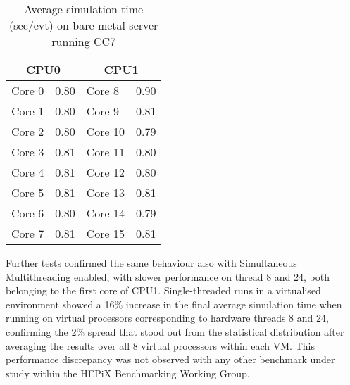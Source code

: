 \documentclass[a4paper]{jpconf}
\begin{document}

\begin{wraptable}{l}{0.35\linewidth}
    \vspace{-3mm}
    \caption{Average simulation time \newline (sec/evt) on bare-metal server \newline 
             running CC7}
    \label{table:simulation-time-cores}
    \begin{tabular}{ |l |  l  || l | l|}
        \hline
        \multicolumn{2}{|c||}{CPU0} & \multicolumn{2}{|c|}{CPU1} \\
        \hline
         Core 0  & 0.80 & Core 8  & 0.90\\
        \hline
         Core 1  & 0.80 & Core 9  & 0.81\\
        \hline
         Core 2  & 0.80 & Core 10  & 0.79\\
        \hline
         Core 3  & 0.81 & Core 11  & 0.80\\
        \hline
         Core 4  & 0.81 & Core 12  & 0.80\\
        \hline
         Core 5  & 0.81 & Core 13  & 0.81\\
        \hline
         Core 6  & 0.80 & Core 14 & 0.79\\
        \hline
        Core 7  & 0.81 & Core 15  & 0.81\\
        \hline
    \end{tabular}
    \vspace{-7mm}
\end{wraptable}
Further tests confirmed the same behaviour also with Simultaneous Multithreading
enabled, with slower performance on thread 8 and 24, both belonging to the first core of
CPU1. Single-threaded runs in a virtualised environment showed a 16\%
increase in the final average simulation time when running on virtual processors
corresponding to hardware threads 8 and 24, confirming the 2\%
spread that stood out from the statistical distribution after averaging the results
over all 8 virtual processors within each VM. This performance discrepancy
was not observed with any other benchmark under study within the HEPiX Benchmarking
Working Group.
\end{document}

